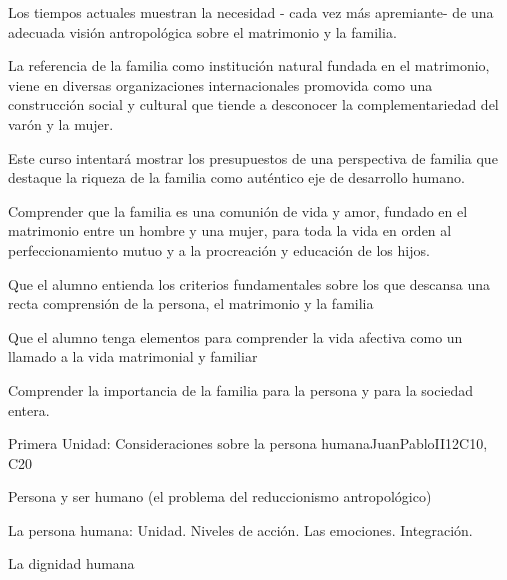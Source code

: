 \begin{syllabus}


\begin{justification}
Los tiempos actuales muestran la necesidad - cada vez más apremiante-  de una adecuada visión antropológica sobre el matrimonio y la familia.

La referencia de la familia como institución natural fundada en el matrimonio, viene en diversas organizaciones internacionales promovida como una construcción social y cultural que tiende a desconocer la complementariedad del varón y la mujer.

Este curso intentará mostrar los presupuestos de una perspectiva de familia que destaque la riqueza de la familia como auténtico eje de desarrollo humano.
\end{justification}

\begin{goals}
	\item Comprender que la familia es una comunión de vida y amor, fundado en el matrimonio entre un hombre y una mujer, para toda la vida en orden al perfeccionamiento mutuo y a la procreación y educación de los hijos.
	\item Que el alumno entienda los criterios fundamentales sobre los que descansa una recta comprensión de la persona, el matrimonio y la familia
	\item Que el alumno tenga elementos para comprender la vida afectiva como un llamado a la vida matrimonial y familiar
	\item Comprender la importancia de la familia para la persona y para la sociedad entera.
\end{goals}

\begin{outcomes}
    \item {}
    \item {}
    \item {}
\end{outcomes}

\begin{competences}
    \item {}
    \item {}
\end{competences}

\begin{unit}{}{Primera Unidad: Consideraciones sobre la persona humana}{JuanPabloII}{12}{C10, C20}
\begin{topics}
	\item Persona y ser humano (el problema del reduccionismo antropológico)
	\item La persona humana: Unidad. Niveles de acción. Las emociones. Integración.
	\item La dignidad humana
\end{topics}


\end{unit}
\end{syllabus}
